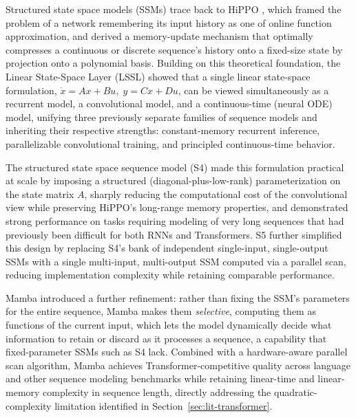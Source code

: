 Structured state space models (SSMs) trace back to HiPPO
\cite{gu2020hippo}, which framed the problem of a network remembering its
input history as one of online function approximation, and derived a
memory-update mechanism that optimally compresses a continuous or discrete
sequence's history onto a fixed-size state by projection onto a
polynomial basis. Building on this theoretical foundation, the Linear
State-Space Layer (LSSL) \cite{gu2021lssl} showed that a single linear
state-space formulation, $\dot{x} = Ax + Bu,\; y = Cx + Du$, can be viewed
simultaneously as a recurrent model, a convolutional model, and a
continuous-time (neural ODE) model, unifying three previously separate
families of sequence models and inheriting their respective strengths:
constant-memory recurrent inference, parallelizable convolutional
training, and principled continuous-time behavior.

The structured state space sequence model (S4) \cite{gu2021s4} made this
formulation practical at scale by imposing a structured (diagonal-plus-low-rank)
parameterization on the state matrix $A$, sharply reducing the
computational cost of the convolutional view while preserving HiPPO's
long-range memory properties, and demonstrated strong performance on
tasks requiring modeling of very long sequences that had previously been
difficult for both RNNs and Transformers. S5 \cite{smith2022s5} further
simplified this design by replacing S4's bank of independent single-input,
single-output SSMs with a single multi-input, multi-output SSM computed
via a parallel scan, reducing implementation complexity while retaining
comparable performance.

Mamba \cite{gu2023mamba} introduced a further refinement: rather than
fixing the SSM's parameters for the entire sequence, Mamba makes them
\emph{selective}, computing them as functions of the current input, which
lets the model dynamically decide what information to retain or discard as
it processes a sequence, a capability that fixed-parameter SSMs such as S4
lack. Combined with a hardware-aware parallel scan
algorithm, Mamba achieves Transformer-competitive quality across language
and other sequence modeling benchmarks while retaining linear-time and
linear-memory complexity in sequence length, directly addressing the
quadratic-complexity limitation identified in
Section~\ref{sec:lit-transformer}.

